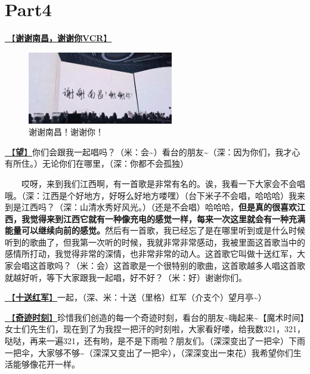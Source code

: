 \documentclass[]{ctexbook}
\begin{document}
\section{Part4}\label{nanchang-20241123-part4}

\hyperref[thank-you-vcr]{🎥【\textbf{谢谢南昌，谢谢你VCR}】}

\begin{figure}

{\centering \includegraphics[width=180pt]{img/nanchang-20241123/thank-nanchang} 

}

\caption{谢谢南昌！谢谢你！}\label{fig:unnamed-chunk-122}
\end{figure}

\hyperref[hope]{🎵【\textbf{望}】}你们会跟我一起唱吗？（米：会\textasciitilde）看台的朋友\textasciitilde（深：因为你们，我才心有所住。）无论你们在哪里，（深：你都不会孤独）

  哎呀，来到我们江西啊，有一首歌是非常有名的。诶，我看一下大家会不会唱哦。（深：江西是个好地方，好呀么好地方喽嘿）（台下米子不会唱，哈哈哈）我来到是江西吗？（深：山清水秀好风光。）（还是不会唱）哈哈哈，\textbf{但是真的很喜欢江西，我觉得来到江西它就有一种像充电的感觉一样，每来一次这里就会有一种充满能量可以继续向前的感觉。}然后有一首歌，我已经忘了是在哪里听到或是什么时候听到的歌曲了，但我第一次听的时候，我就非常非常感动，我被里面这首歌当中的感情所打动，我觉得非常的深情，也非常非常的动人。这首歌它叫做十送红军，大家会唱这首歌吗？（米：会）这首歌是一个很特别的歌曲，这首歌越多人唱这首歌就越好听，等下大家跟我一起唱，好不好？（米：好）谢谢你们。

\hyperref[Seeing-off-the-Red-Amy]{🎵【\textbf{十送红军}】}一起，（深、米：十送（里格）红军（介支个）望月亭\textasciitilde）

\hyperref[magic-moment]{🎵【\textbf{奇迹时刻}】}珍惜我们创造的每一个奇迹时刻，看台的朋友\textasciitilde 嗨起来\textasciitilde【魔术时间】女士们先生们，现在到了为我捏一把汗的时刻啦，大家看好喽，给我数321，321，哒哒，再来一遍321，还有哟，是不是下雨啦？朋友们。（深深变出了一把伞）下雨一把伞，大家够不够\textasciitilde（深深又变出了一把伞），（深深变出一束花）我希望你们生活能够像花开一样。
\end{document}
